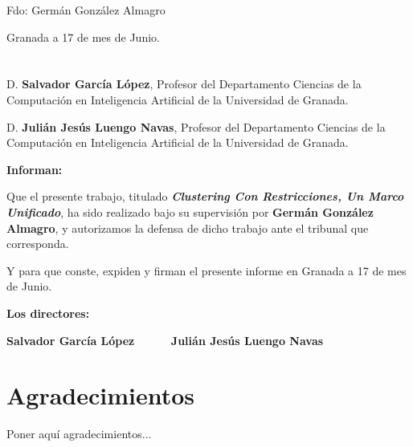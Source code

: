 \vspace{6cm}

\noindent Fdo: Germán González Almagro

\vspace{2cm}

\begin{flushright}
Granada a 17 de mes de Junio.
\end{flushright}


\chapter*{}
\thispagestyle{empty}


D. \textbf{Salvador García López}, Profesor del Departamento Ciencias de la Computación en Inteligencia Artificial de la Universidad de Granada.

\vspace{0.5cm}

D. \textbf{Julián Jesús Luengo Navas}, Profesor del Departamento Ciencias de la Computación en Inteligencia Artificial de la Universidad de Granada.


\vspace{0.5cm}

\textbf{Informan:}

\vspace{0.5cm}

Que el presente trabajo, titulado \textit{\textbf{Clustering Con Restricciones, Un Marco Unificado}},
ha sido realizado bajo su supervisión por \textbf{Germán González Almagro}, y autorizamos la defensa de dicho trabajo ante el tribunal
que corresponda.

\vspace{0.5cm}

Y para que conste, expiden y firman el presente informe en Granada a 17 de mes de Junio.

\vspace{1cm}

\textbf{Los directores:}

\vspace{5cm}

\noindent \textbf{Salvador García López \ \ \ \ \ Julián Jesús Luengo Navas}

\chapter*{Agradecimientos}
\thispagestyle{empty}

       \vspace{1cm}


Poner aquí agradecimientos...

